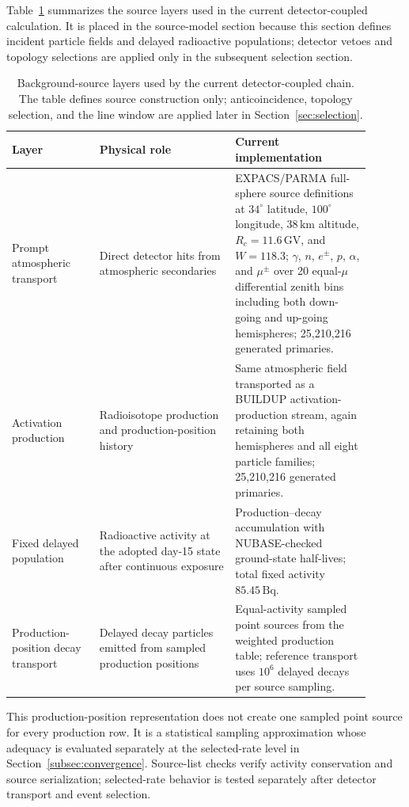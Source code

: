 \documentclass[pdflatex,sn-mathphys-num]{sn-jnl}
\begin{document}
Table~\ref{tab:background_source_model} summarizes the source layers used in the
current detector-coupled calculation. It is placed in the source-model section
because this section defines incident particle fields and delayed radioactive
populations; detector vetoes and topology selections are applied only in the
subsequent selection section.

\begin{table}[t]
\centering
\caption{Background-source layers used by the current detector-coupled chain. The table defines source construction only; anticoincidence, topology selection, and the line window are applied later in Section~\ref{sec:selection}.}
\label{tab:background_source_model}
\begin{tabular}{p{0.22\linewidth}p{0.34\linewidth}p{0.34\linewidth}}
\hline
Layer & Physical role & Current implementation \\
\hline
Prompt atmospheric transport & Direct detector hits from atmospheric secondaries & EXPACS/PARMA full-sphere source definitions at $34^\circ$ latitude, $100^\circ$ longitude, $38\,\mathrm{km}$ altitude, $R_c=11.6\,\mathrm{GV}$, and $W=118.3$; $\gamma$, $n$, $e^\pm$, $p$, $\alpha$, and $\mu^\pm$ over 20 equal-$\mu$ differential zenith bins including both down-going and up-going hemispheres; 25,210,216 generated primaries. \\
Activation production & Radioisotope production and production-position history & Same atmospheric field transported as a BUILDUP activation-production stream, again retaining both hemispheres and all eight particle families; 25,210,216 generated primaries. \\
Fixed delayed population & Radioactive activity at the adopted day-15 state after continuous exposure & Production--decay accumulation with NUBASE-checked ground-state half-lives; total fixed activity $85.45\,\mathrm{Bq}$. \\
Production-position decay transport & Delayed decay particles emitted from sampled production positions & Equal-activity sampled point sources from the weighted production table; reference transport uses $10^6$ delayed decays per source sampling. \\
\hline
\end{tabular}
\end{table}

This production-position representation does not create one sampled point source
for every production row. It is a statistical sampling approximation whose
adequacy is evaluated separately at the selected-rate level in
Section~\ref{subsec:convergence}. Source-list checks verify activity
conservation and source serialization; selected-rate behavior is tested
separately after detector transport and event selection.
\end{document}
